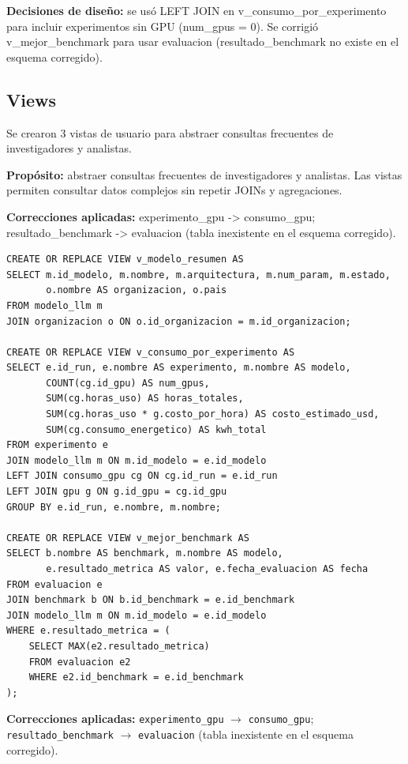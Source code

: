 \documentclass[12pt,a4paper]{article}
\begin{document}
\textbf{Decisiones de diseño:} se usó LEFT JOIN en v_consumo_por_experimento para incluir experimentos sin GPU (num_gpus = 0). Se corrigió v_mejor_benchmark para usar evaluacion (resultado_benchmark no existe en el esquema corregido).

\subsection{Views}

Se crearon 3 vistas de usuario para abstraer consultas frecuentes de investigadores y analistas.

\textbf{Propósito:} abstraer consultas frecuentes de investigadores y analistas. Las vistas permiten consultar datos complejos sin repetir JOINs y agregaciones.

\textbf{Correcciones aplicadas:} experimento_gpu -> consumo_gpu; resultado_benchmark -> evaluacion (tabla inexistente en el esquema corregido).

\begin{lstlisting}
CREATE OR REPLACE VIEW v_modelo_resumen AS
SELECT m.id_modelo, m.nombre, m.arquitectura, m.num_param, m.estado,
       o.nombre AS organizacion, o.pais
FROM modelo_llm m
JOIN organizacion o ON o.id_organizacion = m.id_organizacion;

CREATE OR REPLACE VIEW v_consumo_por_experimento AS
SELECT e.id_run, e.nombre AS experimento, m.nombre AS modelo,
       COUNT(cg.id_gpu) AS num_gpus,
       SUM(cg.horas_uso) AS horas_totales,
       SUM(cg.horas_uso * g.costo_por_hora) AS costo_estimado_usd,
       SUM(cg.consumo_energetico) AS kwh_total
FROM experimento e
JOIN modelo_llm m ON m.id_modelo = e.id_modelo
LEFT JOIN consumo_gpu cg ON cg.id_run = e.id_run
LEFT JOIN gpu g ON g.id_gpu = cg.id_gpu
GROUP BY e.id_run, e.nombre, m.nombre;

CREATE OR REPLACE VIEW v_mejor_benchmark AS
SELECT b.nombre AS benchmark, m.nombre AS modelo,
       e.resultado_metrica AS valor, e.fecha_evaluacion AS fecha
FROM evaluacion e
JOIN benchmark b ON b.id_benchmark = e.id_benchmark
JOIN modelo_llm m ON m.id_modelo = e.id_modelo
WHERE e.resultado_metrica = (
    SELECT MAX(e2.resultado_metrica)
    FROM evaluacion e2
    WHERE e2.id_benchmark = e.id_benchmark
);
\end{lstlisting}

\textbf{Correcciones aplicadas:} \texttt{experimento\_gpu} $\rightarrow$ \texttt{consumo\_gpu}; \texttt{resultado\_benchmark} $\rightarrow$ \texttt{evaluacion} (tabla inexistente en el esquema corregido).
\end{document}
